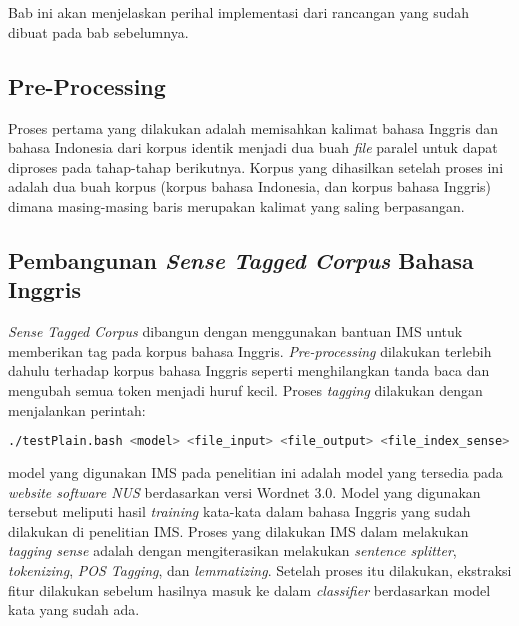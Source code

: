 \chapter{\babEmpat} \label{implementasi}
Bab ini akan menjelaskan perihal implementasi dari rancangan yang sudah dibuat pada bab sebelumnya.

\section{Pre-Processing}
Proses pertama yang dilakukan adalah memisahkan kalimat bahasa Inggris dan bahasa Indonesia dari korpus identik menjadi dua buah \textit{file} paralel untuk dapat diproses pada tahap-tahap berikutnya. Korpus yang dihasilkan setelah proses ini adalah dua buah korpus (korpus bahasa Indonesia, dan korpus bahasa Inggris) dimana masing-masing baris merupakan kalimat yang saling berpasangan.


\section{Pembangunan \textit{Sense Tagged Corpus} Bahasa Inggris}
\textit{Sense Tagged Corpus} dibangun dengan menggunakan bantuan IMS untuk memberikan tag pada korpus bahasa Inggris. \textit{Pre-processing} dilakukan terlebih dahulu terhadap korpus bahasa Inggris seperti menghilangkan tanda baca dan mengubah semua token menjadi huruf kecil. Proses \textit{tagging} dilakukan dengan menjalankan perintah:

\begin{lstlisting}[language=bash, caption={IMS}, label={IMS}]
./testPlain.bash <model> <file_input> <file_output> <file_index_sense>
\end{lstlisting}

model yang digunakan IMS pada penelitian ini adalah model yang tersedia pada \textit{website software NUS} berdasarkan versi Wordnet 3.0. Model yang digunakan tersebut meliputi hasil \textit{training} kata-kata dalam bahasa Inggris yang sudah dilakukan di penelitian IMS. Proses yang dilakukan IMS dalam melakukan \textit{tagging sense} adalah dengan mengiterasikan melakukan \textit{sentence splitter}, \textit{tokenizing}, \textit{POS Tagging}, dan \textit{lemmatizing}. Setelah proses itu dilakukan, ekstraksi fitur dilakukan sebelum hasilnya masuk ke dalam \textit{classifier} berdasarkan model kata yang sudah ada. 


